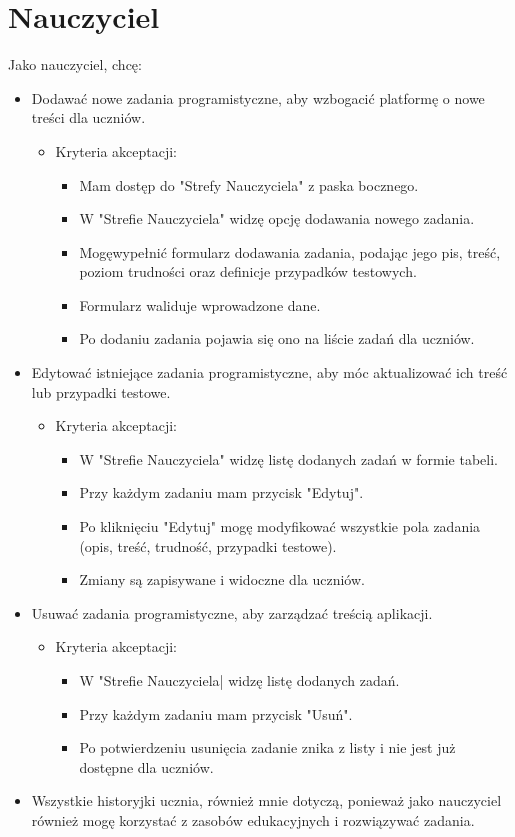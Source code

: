 \documentclass[shortabstract,inz]{iithesis}
\begin{document}
\section{Nauczyciel}
Jako nauczyciel, chcę:
\begin{itemize}
    \item Dodawać nowe zadania programistyczne, aby wzbogacić platformę o nowe treści dla uczniów.
    \begin{itemize}
        \item Kryteria akceptacji:
        \begin{itemize}
            \item Mam dostęp do "Strefy Nauczyciela" z paska bocznego.
            \item W "Strefie Nauczyciela" widzę opcję dodawania nowego zadania.
            \item Mogęwypełnić formularz dodawania zadania, podając jego pis, treść, poziom trudności oraz definicje przypadków testowych.
            \item Formularz waliduje wprowadzone dane.
            \item Po dodaniu zadania pojawia się ono na liście zadań dla uczniów.
        \end{itemize}
    \end{itemize}
    \item Edytować istniejące zadania programistyczne, aby móc aktualizować ich treść lub przypadki testowe.
    \begin{itemize}
        \item Kryteria akceptacji:
        \begin{itemize}
            \item W "Strefie Nauczyciela" widzę listę dodanych zadań w formie tabeli.
            \item Przy każdym zadaniu mam przycisk "Edytuj".
            \item Po kliknięciu "Edytuj" mogę modyfikować wszystkie pola zadania (opis, treść, trudność, przypadki testowe).
            \item Zmiany są zapisywane i widoczne dla uczniów.
        \end{itemize}
    \end{itemize}
    \item Usuwać zadania programistyczne, aby zarządzać treścią aplikacji.
    \begin{itemize}
        \item Kryteria akceptacji:
        \begin{itemize}
            \item W "Strefie Nauczyciela| widzę listę dodanych zadań.
            \item Przy każdym zadaniu mam przycisk "Usuń".
            \item Po potwierdzeniu usunięcia zadanie znika z listy i nie jest już dostępne dla uczniów.
        \end{itemize}
    \end{itemize}
    \item Wszystkie historyjki ucznia, również mnie dotyczą, ponieważ jako nauczyciel również mogę korzystać z zasobów edukacyjnych i rozwiązywać zadania.
\end{itemize}
\end{document}
